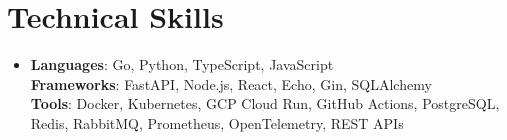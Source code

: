 \documentclass[letterpaper,11pt]{article}
\begin{document}
\section{Technical Skills}
\begin{itemize}[leftmargin=0.15in, label={}, topsep=0pt, itemsep=0pt, parsep=0pt, partopsep=0pt]
  \item{\fontsize{9.0pt}{9.25pt}\selectfont
   \textbf{Languages}{: Go, Python, TypeScript, JavaScript} \\
   \textbf{Frameworks}{: FastAPI, Node.js, React, Echo, Gin, SQLAlchemy} \\
   \textbf{Tools}{: Docker, Kubernetes, GCP Cloud Run, GitHub Actions, PostgreSQL, Redis, RabbitMQ, Prometheus, OpenTelemetry, REST APIs} \\
  }
\end{itemize}
\end{document}
